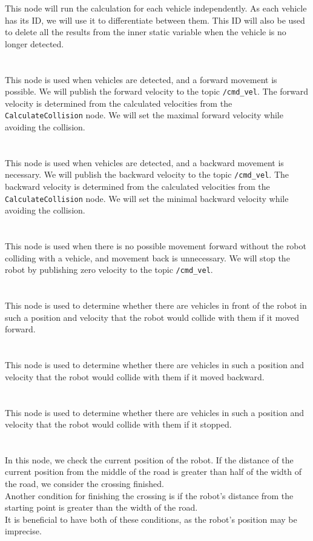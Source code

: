         This node will run the calculation for each vehicle independently. As each vehicle has its ID, we will use it to differentiate between them. This ID will also be used to delete all the results from the inner static variable when the vehicle is no longer detected.\\\\
    \\
        This node is used when vehicles are detected, and a forward movement is possible. We will publish the forward velocity to the topic \texttt{/cmd\_vel}. The forward velocity is determined from the calculated velocities from the \texttt{CalculateCollision} node. We will set the maximal forward velocity while avoiding the collision.\\\\
    \\
        This node is used when vehicles are detected, and a backward movement is necessary. We will publish the backward velocity to the topic \texttt{/cmd\_vel}. The backward velocity is determined from the calculated velocities from the \texttt{CalculateCollision} node. We will set the minimal backward velocity while avoiding the collision.\\\\
    \\
        This node is used when there is no possible movement forward without the robot colliding with a vehicle, and movement back is unnecessary. We will stop the robot by publishing zero velocity to the topic \texttt{/cmd\_vel}.\\\\
    \\
        This node is used to determine whether there are vehicles in front of the robot in such a position and velocity that the robot would collide with them if it moved forward.\\\\
    \\
        This node is used to determine whether there are vehicles in such a position and velocity that the robot would collide with them if it moved backward.\\\\
    \\
        This node is used to determine whether there are vehicles in such a position and velocity that the robot would collide with them if it stopped.\\\\
    \\
        In this node, we check the current position of the robot. If the distance of the current position from the middle of the road is greater than half of the width of the road, we consider the crossing finished.\\
        Another condition for finishing the crossing is if the robot's distance from the starting point is greater than the width of the road.\\
        It is beneficial to have both of these conditions, as the robot's position may be imprecise.
